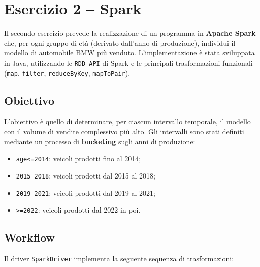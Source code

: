 \chapter{Esercizio 2 -- Spark}
	Il secondo esercizio prevede la realizzazione di un programma in \textbf{Apache Spark} che, per ogni gruppo di età (derivato dall’anno di produzione), individui il modello di automobile BMW più venduto.
	L’implementazione è stata sviluppata in Java, utilizzando le \texttt{RDD API} di Spark e le principali trasformazioni funzionali (\texttt{map}, \texttt{filter}, \texttt{reduceByKey}, \texttt{mapToPair}).
	
	\section{Obiettivo}
		L’obiettivo è quello di determinare, per ciascun intervallo temporale, il modello con il volume di vendite complessivo più alto.
		Gli intervalli sono stati definiti mediante un processo di \textbf{bucketing} sugli anni di produzione:
		
		\begin{itemize}
			\item \texttt{age<=2014}: veicoli prodotti fino al 2014;
			\item \texttt{2015\_2018}: veicoli prodotti dal 2015 al 2018;
			\item \texttt{2019\_2021}: veicoli prodotti dal 2019 al 2021;
			\item \texttt{>=2022}: veicoli prodotti dal 2022 in poi.
		\end{itemize}
	
	\section{Workflow}
		Il driver \texttt{SparkDriver} implementa la seguente sequenza di trasformazioni:
		

